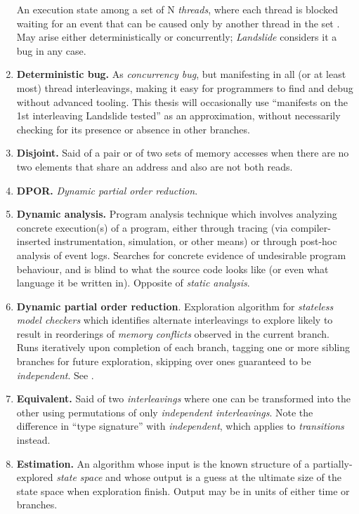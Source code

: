 \begin{enumerate}
		An execution state among a set of N {\em threads},
		where each thread is blocked waiting for an event that can be caused only by another thread in the set
		\cite{deadlock}.
		May arise either deterministically or concurrently; {\em Landslide} considers it a bug in any case.
	\item {\bf Deterministic bug.}
		As {\em concurrency bug}, but manifesting in all (or at least most) thread interleavings,
		making it easy for programmers to find and debug without advanced tooling.
		This thesis will occasionally use ``manifests on the 1st interleaving Landslide tested''
		as an approximation, without necessarily checking for its presence or absence in other branches.
	\item {\bf Disjoint.}
		Said of a pair or of two sets of memory accesses
		when there are no two elements that share an address and also are not both reads.
	\item {\bf DPOR.} {\em Dynamic partial order reduction}.
	\item {\bf Dynamic analysis.}
		Program analysis technique which involves analyzing concrete execution(s) of a program,
		either through tracing (via compiler-inserted instrumentation, simulation, or other means)
		or through post-hoc analysis of event logs.
		Searches for concrete evidence of undesirable program behaviour,
		and is blind to what the source code looks like (or even what language it be written in).
		Opposite of {\em static analysis}.
	\item {\bf Dynamic partial order reduction}.
		Exploration algorithm for {\em stateless model checkers} which
		identifies alternate interleavings to explore likely to result
		in reorderings of {\em memory conflicts} observed in the current branch.
		Runs iteratively upon completion of each branch, tagging one or more sibling branches
		for future exploration, skipping over ones guaranteed to be {\em independent}.
		See \sect{\ref{sec:landslide-dpor}}.
	\item {\bf Equivalent.}
		Said of two {\em interleavings} where one can be transformed into the other using
		permutations of only {\em independent interleavings}.
		Note the difference in ``type signature'' with {\em independent}, which applies to {\em transitions} instead.
	\item {\bf Estimation.}
		An algorithm whose input is the known structure of a partially-explored {\em state space}
		and whose output is a guess at the ultimate size of the state space when exploration finish. %
		Output may be in units of either time or branches.

\end{enumerate}
